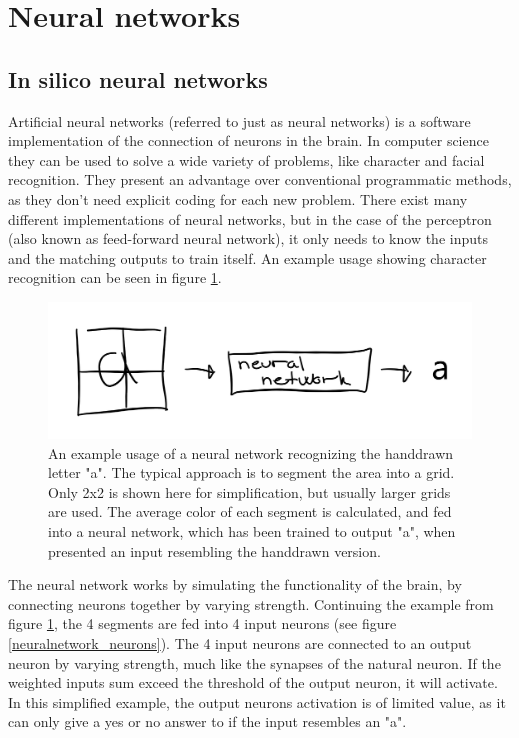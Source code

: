 \section{Neural networks}
\subsection{In silico neural networks}
Artificial neural networks (referred to just as neural networks) is a software implementation of the connection of neurons in the brain. In computer science they can be used to solve a wide variety of problems, like character and facial recognition. They present an advantage over conventional programmatic methods, as they don't need explicit coding for each new problem. There exist many different implementations of neural networks, but in the case of the perceptron (also known as feed-forward neural network), it only needs to know the inputs and the matching outputs to train itself. An example usage showing character recognition can be seen in figure \ref{neuralnetwork_example}.

\begin{figure}[H]
\centering
\includegraphics[width=\columnwidth]{images/neuralnetwork_example.png}
\caption{An example usage of a neural network recognizing the handdrawn letter "a". The typical approach is to segment the area into a grid. Only 2x2 is shown here for simplification, but usually larger grids are used. The average color of each segment is calculated, and fed into a neural network, which has been trained to output "a", when presented an input resembling the handdrawn version.}
\label{neuralnetwork_example}
\end{figure}

The neural network works by simulating the functionality of the brain, by connecting neurons together by varying strength. Continuing the example from figure \ref{neuralnetwork_example}, the 4 segments are fed into 4 input neurons (see figure \ref{neuralnetwork_neurons}). The 4 input neurons are connected to an output neuron by varying strength, much like the synapses of the natural neuron. If the weighted inputs sum exceed the threshold of the output neuron, it will activate. In this simplified example, the output neurons activation is of limited value, as it can only give a yes or no answer to if the input resembles an "a".

